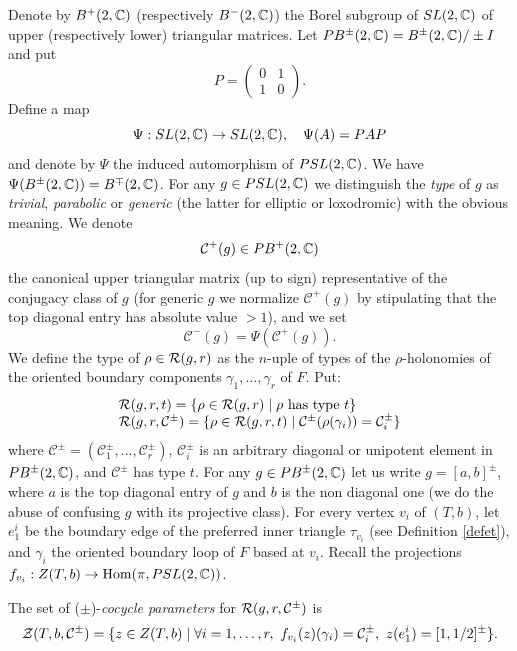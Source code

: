 Denote by $B^+(2,{\mathbb C})$ (respectively $B^-(2,{\mathbb C})$) the Borel subgroup of
$SL(2,{\mathbb C})$ of upper (respectively lower) triangular matrices. Let
$PB^\pm(2,{\mathbb C})= B^\pm(2,{\mathbb C})/\pm I$ and put
$$ P=\left( \begin{array}{cc} 0 & 1 \\ 1 & 0  \end{array}\right).$$
Define a map
\begin{equation}\label{convert}
\Psi : SL(2,{\mathbb C})\to SL(2,{\mathbb C}),\quad \Psi(A)=PAP
\end{equation}
and denote by $\Psi$ the induced automorphism of $PSL(2,{\mathbb C})$. We
have $\Psi(B^\pm(2,{\mathbb C})) = B^\mp(2,{\mathbb C})$. %
For any $g\in PSL(2,{\mathbb C})$ we distinguish the {\it type} of $g$ as
{\it
  trivial}, {\it parabolic} or {\it generic} (the latter for elliptic or
loxodromic) with the obvious meaning. We denote
$$\mathcal{C}^+(g) \in PB^+(2,{\mathbb C})$$ the canonical
upper triangular matrix (up to sign) representative of the conjugacy
class of $g$ (for generic $g$ we normalize $\mathcal{C}^+(g)$ by stipulating
that the top diagonal entry has absolute value $>1$), and we set
$$\mathcal{C}^-(g) = \Psi(\mathcal{C}^+(g)). $$
We define the type of $\rho \in {\mathcal R}(g,r)$ as the $n$-uple of types of
the $\rho$-holonomies of the oriented boundary components
$\gamma_1,\ldots,\gamma_r$ of $F$. Put:
$$\begin{array}{l} {\mathcal R}(g,r,t) = \{ \rho \in {\mathcal R}(g,r) \mid \rho {\rm\
has \ type\ } t\} \\ {\mathcal R}(g,r,\mathcal{C}^\pm) = \{ \rho \in {\mathcal R}(g,r,t)
\mid \mathcal{C}^\pm(\rho(\gamma_i)) = \mathcal{C}_i^\pm\}
\end{array}$$
where $\mathcal{C}^\pm=(\mathcal{C}_1^\pm,\ldots,\mathcal{C}_r^\pm)$,
$\mathcal{C}_i^\pm$ is an arbitrary diagonal or unipotent element in
$PB^\pm(2,{\mathbb C})$, and $\mathcal{C}^\pm$ has type $t$.
\smallskip
For any $g \in PB^\pm(2,{\mathbb C})$ let us write $g=[a,b]^\pm$, where $a$ is
the top diagonal entry of $g$ and $b$ is the non diagonal one (we do
the abuse of confusing $g$ with its projective class). For every
vertex $v_i$ of $(T,b)$, let $e_1^i$ be the boundary edge of the
preferred inner triangle $\tau_{v_i}$ (see Definition \ref{defet}),
and $\gamma_i$ the oriented boundary loop of $F$ based at
$v_i$. Recall the projections $f_{v_i}: Z(T,b) \to {\rm Hom}(\pi,
PSL(2,{\mathbb C}))$.
\begin{defi} \label{defcoc}
The set of ($\pm$)-{\it cocycle parameters} for
${\mathcal R}(g,r,\mathcal{C}^\pm)$ is $${\mathcal Z}(T,b,\mathcal{C}^\pm) = \{ z
\in Z(T,b) \mid \forall i=1,\ldots,r,\ f_{v_i}(z)(\gamma_i) =
\mathcal{C}^\pm_i,\ z(e_1^i)= [1,1/2]^\pm \}.$$
\end{defi}
